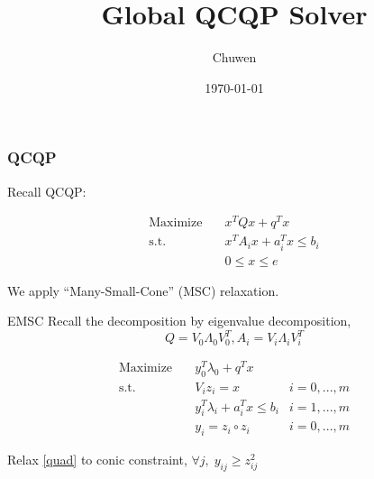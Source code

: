 
\usepackage{subfig}
\usepackage[style=verbose]{biblatex}
\usepackage{bm}
\title{Global QCQP Solver}
\author{Chuwen}
\date{\today}




\fontsize{8pt}{11.2}\selectfont
\frame{\titlepage}



\begin{frame}
  \frametitle{QCQP}
  Recall QCQP:

  \begin{equation}
    \begin{aligned}
      \mathrm{Maximize}\quad & x^TQx + q^T x                   \\
      \mathrm{s.t.}  \quad   & x^{T} A_i x  + a_i^Tx   \le b_i \\
                             & 0\le x\le e
    \end{aligned}
  \end{equation}

  We apply ``Many-Small-Cone'' (MSC) relaxation.
\end{frame}


\begin{frame}{EMSC}
  Recall the decomposition by eigenvalue decomposition,
  \[Q = V_0\Lambda_0 V_0 ^T, A_i = V_i\Lambda_i V_i^T \]

  \begin{align}
    \nonumber \mathrm{Maximize}\quad & y_0 ^T\lambda_0 + q^Tx                         \\
    \mathrm{s.t.} \quad              & V_i z_i = x                        & i=0,...,m \\
                                     & y_i ^T\lambda_i  + a_i^Tx  \le b_i & i=1,...,m \\
    \label{quad}                     & y_i = z_i \circ z_i                & i=0,...,m
  \end{align}

  Relax \eqref{quad} to conic constraint, \(\forall j, \; y_{ij} \ge z^2_{ij}\)
\end{frame}

